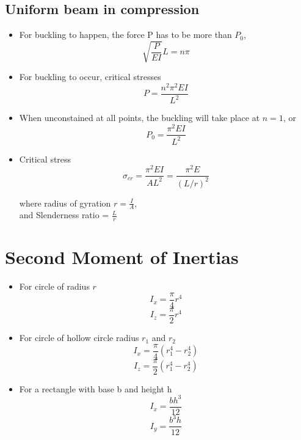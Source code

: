 \documentclass{article}
\begin{document}
	\subsection{Uniform beam in compression}
	\begin{itemize}
		\item For buckling to happen, the force P has to be more than $P_0$, 
				\[\sqrt{\frac{P}{EI}} L = n \pi \]

		\item For buckling to occur, critical stresses
				\[P = \frac{n^2 \pi^2 EI}{L^2}\]

		\item When unconstained at all points, the buckling will take place at $n=1$, or
				\[P_0 = \frac{\pi^2 EI}{L^2}\]

		\item Critical stress
			\[\sigma_{cr} = \frac{\pi^2 EI}{A L^2} = \frac{\pi^2 E}{(L/r)^2}\]

		where radius of gyration $r = \frac{I}{A}$,\\
		and Slenderness ratio = $\frac{L}{r}$
	\end{itemize}


\section{Second Moment of Inertias}
	\begin{itemize}
		\item For circle of radius $r$
			\[I_x = \frac{\pi}{4} r^4\]
			\[I_z = \frac{\pi}{2} r^4\]
		\item For circle of hollow circle radius $r_1$ and $r_2$
			\[I_x = \frac{\pi}{4} (r_1^4 - r_2^4)\]
			\[I_z = \frac{\pi}{2} (r_1^4 - r_2^4)\]

		\item For a rectangle with base b and height h
			\[I_x = \frac{bh^3}{12}\]
			\[I_y = \frac{b^3h}{12}\]

	\end{itemize}
\end{document}
